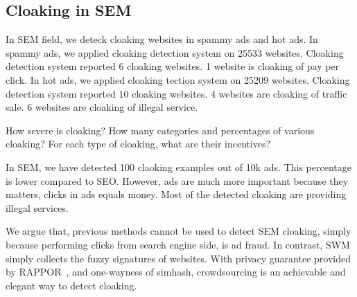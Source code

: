 \subsection{Cloaking in SEM}

In SEM field, we deteck cloaking websites in spammy ads and hot ads. In spammy ads,
we applied cloaking detection system on 25533 websites. Cloaking detection system reported 6 cloaking websites.
1 website is cloaking of pay per click. In hot ads, we applied cloaking tection system on 25209 websites.
Cloaking detection system reported 10 cloaking websites. 4 websites are cloaking of traffic sale.
6 websites are cloaking of illegal service. 

How severe is cloaking? How many categories and percentages of various cloaking?
For each type of cloaking, what are their incentives?

In SEM, we have detected 100 claoking examples out of 10k ads. This percentage
is lower compared to SEO. However, ads are much more important because they
matters, clicks in ads equals money. Most of the detected cloaking are providing
illegal services.

We argue that, previous methods cannot be used to detect SEM cloaking, simply
because performing clicks from search engine side, is ad fraud. In contrast,
SWM simply collects the fuzzy signatures of websites. With privacy guarantee
provided by RAPPOR~\cite{erlingsson2014rappor}, and one-wayness of simhash,
crowdsourcing is an achievable and elegant way to detect cloaking.

%

